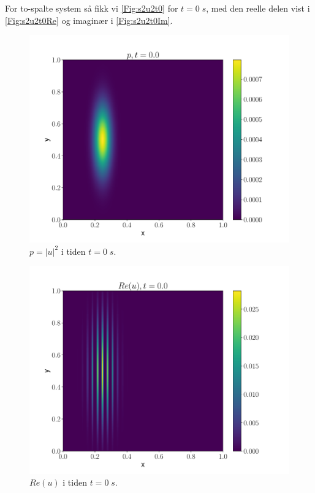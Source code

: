 \documentclass[reprint,english,notitlepage]{revtex4-2}  %
\begin{document}
For to-spalte system så fikk vi \autoref{Fig:s2u2t0} for $t = 0 \; s$, med den reelle delen vist i \autoref{Fig:s2u2t0Re} og imaginær i \autoref{Fig:s2u2t0Im}.

\begin{figure}[H]
	\centering
	\includegraphics[scale=0.45, trim={4cm 0 0 0}]{../Images/ImshowUt00sl2.pdf}
	\caption{$p=|u|^2$ i tiden $t = 0 \; s$.}
	\label{Fig:s2u2t0}
\end{figure}


\begin{figure}[H]
	\centering
	\includegraphics[scale=0.45, trim={4cm 0 0 0}]{../Images/ImshowRe00sl2.pdf}
	\caption{$Re(u) $ i tiden $t = 0 \; s$.}
	\label{Fig:s2u2t0Re}
\end{figure}
\end{document}

